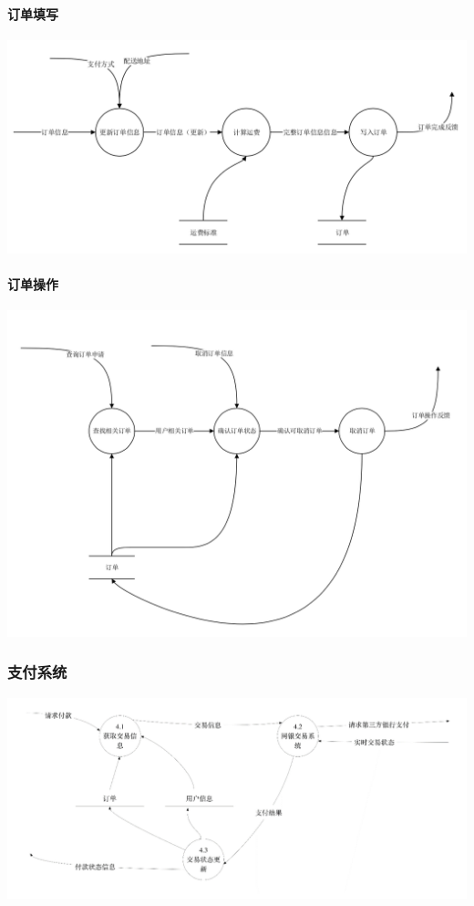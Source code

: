 \paragraph{订单填写}
\begin{center}
    \includegraphics[width=1\linewidth]{img/3.3.png}
\end{center}
\paragraph{订单操作}
\begin{center}
    \includegraphics[width=1\linewidth]{img/3.4.png}
\end{center}
\subsubsection{支付系统}
\begin{center}
    \includegraphics[width=1\linewidth]{img/4.png}
\end{center}
